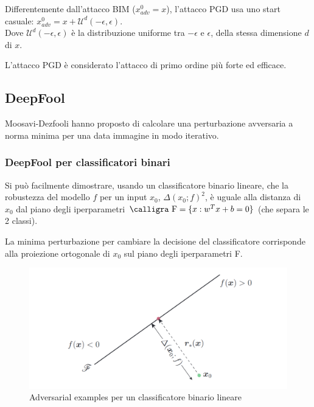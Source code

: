     Differentemente dall'attacco BIM ($x_{adv}^0 = x$), l'attacco PGD usa uno start casuale:
    $x_{adv}^0 = x + \mathcal{U}^d(-\epsilon,\epsilon)$.\\
    Dove $\mathcal{U}^d(-\epsilon,\epsilon)$ è la distribuzione uniforme tra $-\epsilon$ e $\epsilon$, della stessa dimensione $d$ di $x$.
    
    L'attacco PGD è considerato l'attacco di primo ordine più forte ed efficace.
    \newpage
    
    \subsection{DeepFool}
    \label{DeepFool}
    Moosavi-Dezfooli \cite{moosavi2015deepfool} hanno proposto di calcolare una perturbazione avversaria a norma minima per una data immagine in modo iterativo.
    
        \subsubsection*{DeepFool per classificatori binari}
        Si può facilmente dimostrare, usando un classificatore binario lineare, che la robustezza del modello $f$ per un input $x_{0}$, $\Delta(x_0;f)^2$, è uguale alla distanza di $x_{0}$ dal piano degli iperparametri $\text{\calligra F}=\{x:w^Tx+b=0\}$ (che separa le 2 classi).
        
        La minima perturbazione per cambiare la decisione del classificatore corrisponde alla proiezione ortogonale di $x_{0}$ sul piano degli iperparametri {\calligra F}.
            \begin{figure}[h!]
                \centering
                \includegraphics[width=\textwidth]{Images/DeepFool/Deepfool_1.png}
                \caption{Adversarial examples per un classificatore binario lineare}
                \label{DeepFool_1}
            \end{figure}\\
        
